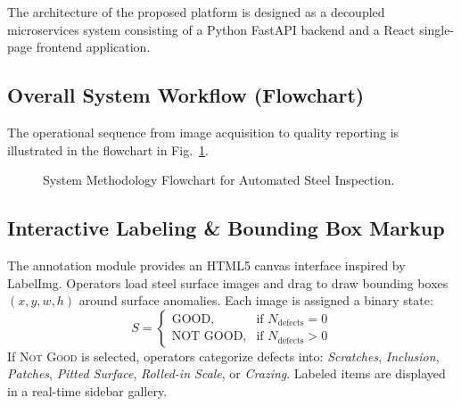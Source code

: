 \documentclass[conference]{IEEEtran}
\begin{document}
The architecture of the proposed platform is designed as a decoupled microservices system consisting of a Python FastAPI backend and a React single-page frontend application.

\subsection{Overall System Workflow (Flowchart)}
The operational sequence from image acquisition to quality reporting is illustrated in the flowchart in Fig.~\ref{fig:system_flowchart}.

\begin{figure}[htbp]
\centering
{}
\caption{System Methodology Flowchart for Automated Steel Inspection.}
\label{fig:system_flowchart}
\end{figure}

\subsection{Interactive Labeling \& Bounding Box Markup}
The annotation module provides an HTML5 canvas interface inspired by LabelImg. Operators load steel surface images and drag to draw bounding boxes $(x, y, w, h)$ around surface anomalies. Each image is assigned a binary state:
\begin{equation}
S = \begin{cases} 
\text{GOOD}, & \text{if } N_{\text{defects}} = 0 \\
\text{NOT GOOD}, & \text{if } N_{\text{defects}} > 0 
\end{cases}
\end{equation}
If \textsc{Not Good} is selected, operators categorize defects into: \textit{Scratches}, \textit{Inclusion}, \textit{Patches}, \textit{Pitted Surface}, \textit{Rolled-in Scale}, or \textit{Crazing}. Labeled items are displayed in a real-time sidebar gallery.
\end{document}
